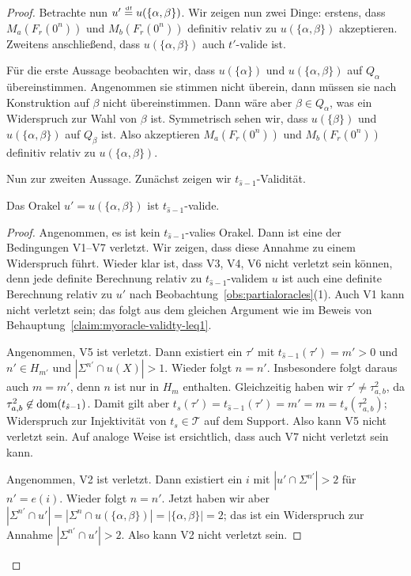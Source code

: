 \begin{proof}
Betrachte nun $u'\stackrel{\text{\smash{\tiny df}}}{=} u(\{\alpha, \beta\})$. Wir zeigen nun zwei Dinge: erstens, dass $M_a(F_r(0^n))$ und $M_b(F_r(0^n))$ definitiv relativ zu $u(\{\alpha, \beta\})$ akzeptieren.
Zweitens anschließend, dass $u(\{\alpha,\beta\})$ auch $t'$-valide ist.

Für die erste Aussage beobachten wir, dass $u(\{\alpha\})$ und $u(\{\alpha, \beta\})$ auf $Q_\alpha$ übereinstimmen. Angenommen sie stimmen nicht überein, dann müssen sie nach Konstruktion auf $\beta$ nicht übereinstimmen. Dann wäre aber $\beta\in Q_\alpha$, was ein Widerspruch zur Wahl von $\beta$ ist.
Symmetrisch sehen wir, dass $u(\{\beta\})$ und $u(\{\alpha, \beta\})$ auf $Q_\beta$ ist.
Also akzeptieren $M_a(F_r(0^n))$ und $M_b(F_r(0^n))$ definitiv relativ zu $u(\{\alpha, \beta\})$.

Nun zur zweiten Aussage. Zunächst zeigen wir $t_{\hat{s}-1}$-Validität.
\begin{claim}\label{claim:myoracle-validty-eq2}
    Das Orakel $u'=u(\{\alpha, \beta\})$ ist $t_{\hat{s}-1}$-valide.
\end{claim}
\begin{proof}
    Angenommen, es ist kein $t_{\hat{s}-1}$-valies Orakel. Dann ist eine der Bedingungen V1--V7 verletzt. Wir zeigen, dass diese Annahme zu einem Widerspruch führt.
    Wieder klar ist, dass V3, V4, V6 nicht verletzt sein können, denn jede definite Berechnung relativ zu $t_{\hat{s}-1}$-validem $u$ ist auch eine definite Berechnung relativ zu $u'$ nach Beobachtung~\ref{obs:partialoracles}(1).
    Auch V1 kann nicht verletzt sein; das folgt aus dem gleichen Argument wie im Beweis von Behauptung~\ref{claim:myoracle-validty-leq1}.

    Angenommen, V5 ist verletzt. Dann existiert ein $\tau'$ mit $t_{\hat{s}-1}(\tau')=m'>0$ und $n'\in H_{m'}$ und $|\Sigma^{n'}\cap u(X)|>1$. 
    Wieder folgt $n=n'$.
    Insbesondere folgt daraus auch $m=m'$, denn $n$ ist nur in $H_m$ enthalten.
    Gleichzeitig haben wir $\tau'\neq \tau^2_{a,b}$, da $\tau^2_{a,b}\not\in\operatorname{dom}(t_{\hat{s}-1})$.
    Damit gilt aber $t_s(\tau')=t_{\hat{s}-1}(\tau')=m'=m=t_s(\tau^2_{a,b})$; Widerspruch zur Injektivität von $t_s\in\mathcal T$ auf dem Support.
    Also kann V5 nicht verletzt sein. 
    Auf analoge Weise ist ersichtlich, dass auch V7 nicht verletzt sein kann.

    Angenommen, V2 ist verletzt. Dann existiert ein $i$ mit $|u'\cap\Sigma^{n'}|>2$ für $n'=e(i)$.
    Wieder folgt $n=n'$.
    Jetzt haben wir aber $|\Sigma^{n'}\cap u'|=|\Sigma^n\cap u(\{\alpha, \beta\})| = |\{\alpha,\beta\}|=2$; das ist ein Widerspruch zur Annahme $|\Sigma^{n'}\cap u'|>2$. Also kann V2 nicht verletzt sein. 


\end{proof}
\end{proof}
